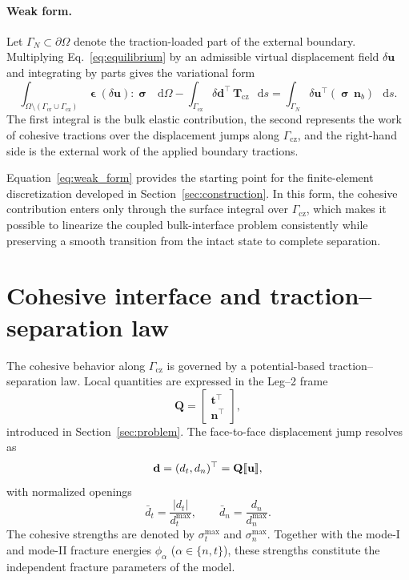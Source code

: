 \documentclass[smallextended]{svjour3}       %
\newcommand{\vb}[1]{\bm{#1}}      %
\newcommand{\uu}{\vb{u}}
\newcommand{\eps}{\bm{\upvarepsilon}}
\newcommand{\sig}{\bm{\upsigma}}
\DeclarePairedDelimiter{\jump}{\llbracket}{\rrbracket}
\newcommand{\dd}{\mathop{}\!\mathrm{d}}  %
\providecommand{\bd}{\vb d}
\renewcommand{\bd}{\vb d}
\providecommand{\bTcz}{\vb{T}_{\mathrm{cz}}}
\renewcommand{\bTcz}{\vb{T}_{\mathrm{cz}}}
\begin{document}
\paragraph{Weak form.}
Let \(\Gamma_N\subset\partial\Omega\) denote the traction-loaded part of the
external boundary. Multiplying Eq.~\eqref{eq:equilibrium} by an admissible
virtual displacement field \(\delta\uu\) and integrating by parts gives the
variational form
\begin{equation}
	\int_{\Omega\setminus(\Gamma_{\mathrm{cr}}\cup\Gamma_{\mathrm{cz}})}
	\eps(\delta\uu):\sig\,\dd\Omega
	-
	\int_{\Gamma_{\mathrm{cz}}}
	\delta\bd^\top\,\bTcz\,\dd s
	=
	\int_{\Gamma_N}
	\delta\uu^\top(\sig\,\vb n_b)\,\dd s .
	\label{eq:weak_form}
\end{equation}
The first integral is the bulk elastic contribution, the second represents
the work of cohesive tractions over the displacement jumps along
\(\Gamma_{\mathrm{cz}}\), and the right-hand side is the external work of the
applied boundary tractions.

Equation~\eqref{eq:weak_form} provides the starting point for the finite-element
discretization developed in Section~\ref{sec:construction}. In this form, the
cohesive contribution enters only through the surface integral over
\(\Gamma_{\mathrm{cz}}\), which makes it possible to linearize the coupled
bulk-interface problem consistently while preserving a smooth transition from
the intact state to complete separation.


\section{Cohesive interface and traction--separation law}
\label{sec:tsl}

The cohesive behavior along \(\Gamma_{\mathrm{cz}}\) is governed by a
potential-based traction--separation law. Local quantities are expressed in
the Leg--2 frame
\[
\mathbf{Q}=
\begin{bmatrix}
	\mathbf{t}^{\top}\\
	\mathbf{n}^{\top}
\end{bmatrix},
\]
introduced in Section~\ref{sec:problem}. The face-to-face displacement jump
resolves as
\[
\mathbf{d}=(d_t,d_n)^{\top}=\mathbf{Q}\jump{\mathbf{u}},
\]
with normalized openings
\[
\bar d_t=\frac{|d_t|}{d_t^{\max}},
\qquad
\bar d_n=\frac{d_n}{d_n^{\max}}.
\]
The cohesive strengths are denoted by \(\sigma_t^{\max}\) and
\(\sigma_n^{\max}\). Together with the mode-I and mode-II fracture energies
\(\phi_{\alpha}\) (\(\alpha\in\{n,t\}\)), these strengths constitute the
independent fracture parameters of the model.
\end{document}
